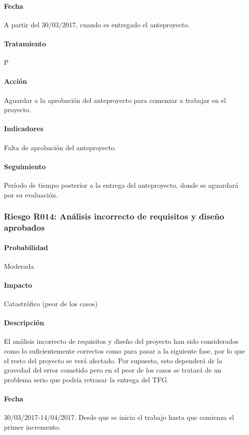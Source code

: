 \documentclass[10pt,a4paper]{article}
\begin{document}
				\paragraph{Fecha} A partir del 30/03/2017, cuando es entregado el anteproyecto.
				\paragraph{Tratamiento} P
				\paragraph{Acción} Aguardar a la aprobación del anteproyecto para comenzar a trabajar en el proyecto.
				\paragraph{Indicadores} Falta de aprobación del anteproyecto.
				\paragraph{Seguimiento}	Período de tiempo posterior a la entrega del anteproyecto, donde se aguardará por su evaluación.
				
				\subsubsection{Riesgo R014: Análisis incorrecto de requisitos y diseño aprobados}
				\paragraph{Probabilidad} Moderada
				\paragraph{Impacto}	Catastrófico (peor de los casos)
				\paragraph{Descripción} El análisis incorrecto de requisitos y diseño del proyecto han sido considerados como lo suficientemente correctos como para pasar a la siguiente fase, por lo que el resto del proyecto se verá afectado. Por supuesto, esto dependerá de la gravedad del error cometido pero en el peor de los casos se tratará de un problema serio que podría retrasar la entrega del TFG.
				\paragraph{Fecha} 30/03/2017-14/04/2017. Desde que se inicia el trabajo hasta que comienza el primer incremento.
\end{document}
